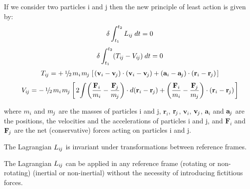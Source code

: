 \documentclass[10pt,fleqn]{article}
\newcommand{\mM}{m}
\newcommand{\mL}{L}
\newcommand{\mT}{T}
\newcommand{\mV}{V}
\newcommand{\ri}{_i}
\newcommand{\vR}{\mathbf{r}}
\newcommand{\vV}{\mathbf{v}}
\newcommand{\vA}{\mathbf{a}}
\newcommand{\vF}{\mathbf{F}}
\newcommand{\Hs}{\hspace{+0.90em}}
\newcommand{\rj}{_{\hspace{-0.081em}j}}
\newcommand{\rij}{_{i\hspace{-0.081em}j}}
\newcommand{\med}{\raise.5ex\hbox{$\scriptstyle 1$}\kern-.15em/\kern-.15em\lower.25ex\hbox{$\scriptstyle 2$}}
\begin{document}
\par If we consider two particles i and j then the new principle of least action is given by:
\vspace{+0.90em}
\begin{eqnarray*}
\Hs \delta \int_{t_1}^{t_2} \mL\rij \hspace{+0.24em} dt = 0
\end{eqnarray*}
\vspace{+0.30em}
\begin{eqnarray*}
\Hs \delta \int_{t_1}^{t_2} (\mT\rij - \mV\rij) \hspace{+0.24em} dt = 0
\end{eqnarray*}
\vspace{+0.30em}
\begin{eqnarray*}
\Hs \mT\rij = + \hspace{+0.18em} \med \hspace{+0.15em} \mM\ri\hspace{+0.09em}\mM\rj \hspace{+0.12em} \left[ \hspace{+0.12em} (\vV\ri - \vV\rj) \cdot (\vV\ri - \vV\rj) + (\vA\ri - \vA\rj) \cdot (\vR\ri - \vR\rj) \hspace{+0.12em} \right]
\end{eqnarray*}
\vspace{+0.30em}
\begin{eqnarray*}
\Hs \mV\rij = - \hspace{+0.18em} \med \hspace{+0.15em} \mM\ri\hspace{+0.09em}\mM\rj \hspace{+0.03em} \left[ \hspace{+0.12em} 2 \hspace{-0.12em} \int \hspace{-0.12em} \left(\frac{\vF\ri}{\mM\ri} - \frac{\vF\rj}{\mM\rj}\right) \cdot d(\vR\ri - \vR\rj) + \left(\frac{\vF\ri}{\mM\ri} - \frac{\vF\rj}{\mM\rj}\right) \cdot (\vR\ri - \vR\rj) \hspace{+0.12em} \right]
\end{eqnarray*}
\vspace{+0.60em}
\par \noindent where $\mM\ri$ and $\mM\rj$ are the masses of particles i and j, $\vR\ri$, $\vR\rj$, $\vV\ri$, $\vV\rj$, $\vA\ri$ and $\vA\rj$ are the positions, the velocities and the accelerations of particles i and j, and $\vF\ri$ and $\vF\rj$ are the net (conservative) forces acting on particles i and j.
\bigskip
\par The Lagrangian $\mL\rij$ is invariant under transformations between reference frames.
\bigskip
\par The Lagrangian $\mL\rij$ can be applied in any reference frame (rotating or non-rotating) (inertial or non-inertial) without the necessity of introducing fictitious forces.
\end{document}
